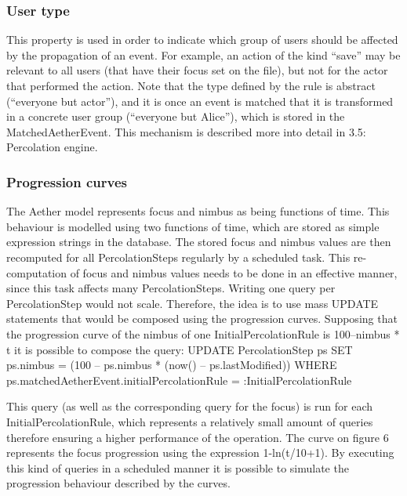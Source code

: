 \documentclass{ecscw2007}
\begin{document}
\subsubsection*{User type}
This property is used in order to indicate which group of users should be affected by the propagation of an event. For example, an action of the kind ``save'' may be relevant to all users (that have their focus set on the file), but not for the actor that performed the action. Note that the type defined by the rule is abstract (``everyone but actor''), and it is once an event is matched that it is transformed in a concrete user group (``everyone but Alice''), which is stored in the MatchedAetherEvent. This mechanism is described more into detail in 3.5: Percolation engine.

\subsubsection*{Progression curves}
The Aether model represents focus and nimbus as being functions of time. This behaviour is modelled using two functions of time, which are stored as simple expression strings in the database. The stored focus and nimbus values are then recomputed for all PercolationSteps regularly by a scheduled task.
This re-computation of focus and nimbus values needs to be done in an effective manner, since this task affects many PercolationSteps. Writing one query per PercolationStep would not scale.
Therefore, the idea is to use mass UPDATE statements that would be composed using the progression curves. Supposing that the progression curve of the nimbus of one InitialPercolationRule is 100–nimbus * t it is possible to compose the query:
UPDATE
       PercolationStep ps
SET
       ps.nimbus = (100 – ps.nimbus * (now() – ps.lastModified))
WHERE
       ps.matchedAetherEvent.initialPercolationRule = :InitialPercolationRule

This query (as well as the corresponding query for the focus) is run for each InitialPercolationRule, which represents a relatively small amount of queries therefore ensuring a higher performance of the operation.
The curve on figure 6 represents the focus progression using the expression 1-ln(t/10+1).
By executing this kind of queries in a scheduled manner it is possible to simulate the progression behaviour described by the curves.
\end{document}
